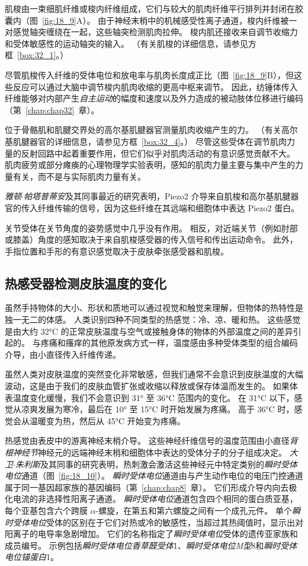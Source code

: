 肌梭由一束细肌纤维或梭内纤维组成，它们与较大的肌肉纤维平行排列并封闭在胶囊内（图~\ref{fig:18_9}A）。
由于神经末梢中的机械感受性离子通道，梭内纤维被一对感觉轴突缠绕在一起，这些轴突检测肌肉拉伸。
梭内肌还接收来自调节收缩力和受体敏感性的运动轴突的输入。
（有关肌梭的详细信息，请参见方框~\ref{box:32_1}。）


尽管肌梭传入纤维的受体电位和放电率与肌肉长度成正比（图~\ref{fig:18_9}B），但这些反应可以通过大脑中调节梭内肌肉收缩的更高中枢来调节。
因此，纺锤体传入纤维能够对内部产生\textit{自主运动}的幅度和速度以及外力造成的被动肢体位移进行编码（第~\ref{chap:chap32}~章）。


位于骨骼肌和肌腱交界处的高尔基肌腱器官测量肌肉收缩产生的力。
（有关高尔基肌腱器官的详细信息，请参见方框~\ref{box:32_4}。）
尽管这些受体在调节肌肉力量的反射回路中起着重要作用，但它们似乎对肌肉活动的有意识感觉贡献不大。
肌肉疲劳或部分瘫痪的心理物理学实验表明，感知的肌肉力量主要与集中产生的力量有关，而不是与实际肌肉力量有关。


\textit{雅顿$\cdot$帕塔普蒂安}及其同事最近的研究表明，Piezo2 介导来自肌梭和高尔基肌腱器官的传入纤维传输的信号，因为这些纤维在其远端和细胞体中表达 Piezo2 蛋白。


关节受体在关节角度的姿势感觉中几乎没有作用。
相反，对近端关节（例如肘部或膝盖）角度的感知取决于来自肌梭感受器的传入信号和传出运动命令。
此外，手指位置和手形的有意识感觉取决于皮肤牵张感受器和肌梭。



\subsection{热感受器检测皮肤温度的变化}

虽然手持物体的大小、形状和质地可以通过视觉和触觉来理解，但物体的热特性是独一无二的体感。
人类识别四种不同类型的热感觉：冷、凉、暖和热。
这些感觉是由大约 32°C 的正常皮肤温度与空气或接触身体的物体的外部温度之间的差异引起的。
与疼痛和瘙痒的其他原发病方式一样，温度感由多种受体类型的组合编码介导，由小直径传入纤维传递。


虽然人类对皮肤温度的突然变化非常敏感，但我们通常不会意识到皮肤温度的大幅波动，这是由于我们的皮肤血管扩张或收缩以释放或保存体温而发生的。
如果体表温度变化缓慢，我们不会意识到 31° 至 36°C 范围内的变化。
在 31°C 以下，感觉从凉爽发展为寒冷，最后在 10° 至 15°C 时开始发展为疼痛。
高于 36°C 时，感觉会从温暖变为热，然后从 45°C 开始变为疼痛。


热感觉由表皮中的游离神经末梢介导。
这些神经纤维信号的温度范围由小直径\textit{背根神经节}神经元的远端神经末梢和细胞体中表达的受体分子的分子组成决定。
\textit{大卫$\cdot$朱利斯}及其同事的研究表明，热刺激会激活这些神经元中特定类别的\textit{瞬时受体电位}通道（图~\ref{fig:18_10}）。
\textit{瞬时受体电位}通道由与产生动作电位的电压门控通道属于同一基因超家族的基因编码（第~\ref{chap:chap8}~章）。 
它们形成介导内向去极化电流的非选择性阳离子通道。
\textit{瞬时受体电位}通道包含四个相同的蛋白质亚基，每个亚基包含六个跨膜 $\alpha$-螺旋，在第五和第六螺旋之间有一个成孔元件。
单个\textit{瞬时受体电位}受体的区别在于它们对热或冷的敏感性，当超过其热阈值时，显示出对阳离子的电导率急剧增加。
它们的名称指定了\textit{瞬时受体电位}受体的遗传亚家族和成员编号。 
示例包括\textit{瞬时受体电位香草醛受体}1、\textit{瞬时受体电位M型}8和\textit{瞬时受体电位锚蛋白}1。



